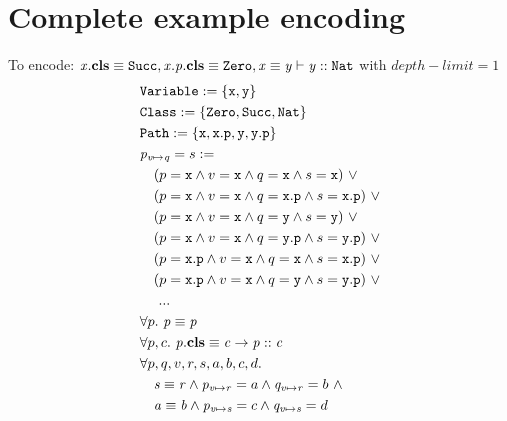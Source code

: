 \documentclass[a4paper]{article}
\begin{document}
\section{Complete example encoding}
To encode: $\mathit{x}.\textbf{cls} \equiv \mathit{\mathtt{Succ}}, \mathit{x.p}.\textbf{cls} \equiv \mathit{\mathtt{Zero}}, \mathit{x} \equiv \mathit{y} \vdash \mathit{y} :: \mathit{\mathtt{Nat}}$
with $\mathit{depth\!\!-\!\!limit}=1$
\begin{align}
  &\texttt{\Variable} := \{\mathtt{x}, \mathtt{y}\}\\
  &\texttt{\Class} := \{\Zero,\Succ,\Nat\}\\
  &\texttt{\Path} := \{\mathtt{x}, \mathtt{x}.\mathtt{p}, \mathtt{y}, \mathtt{y}.\mathtt{p}\}\\
  &\subst{p}{v}{q} = s :=\\
  &\quad (p=\mathtt{x} \land v=\mathtt{x} \land q=\mathtt{x} \land s=\mathtt{x})~\lor\\
  &\quad (p=\mathtt{x} \land v=\mathtt{x} \land q=\mathtt{x.p} \land s=\mathtt{x.p})~\lor\\
  &\quad (p=\mathtt{x} \land v=\mathtt{x} \land q=\mathtt{y} \land s=\mathtt{y})~\lor\\
  &\quad (p=\mathtt{x} \land v=\mathtt{x} \land q=\mathtt{y.p} \land s=\mathtt{y.p})~\lor\\
  &\quad (p=\mathtt{x.p} \land v=\mathtt{x} \land q=\mathtt{x} \land s=\mathtt{x.p})~\lor\\
  &\quad (p=\mathtt{x.p} \land v=\mathtt{x} \land q=\mathtt{y} \land s=\mathtt{y.p})~\lor\\
  &\quad~...\\
  &\forall p.~\pathEq{p}{p}\\
  &\forall p, c.~\instBy{p}{c} \rightarrow \instOf{p}{c}\\
  &\forall p, q, v, r, s, a, b, c, d.\\
  &\quad \pathEq{s}{r} \land \subst{p}{v}{r}=a \land \subst{q}{v}{r}=b~\land\\
  &\quad \pathEq{a}{b} \land
         \subst{p}{v}{s}=c \land \subst{q}{v}{s}=d\\

\end{align}
\end{document}
